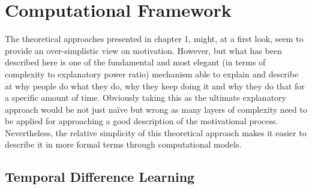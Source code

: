 \section{Computational Framework}
\label{comp_framework}
The theoretical approaches presented in chapter 1, might, at a first look, seem to provide an over-simplistic view on motivation. However, but what has been described here is one of the fundamental and most elegant (in terms of complexity to explanatory power ratio) mechanism able to explain and describe at why people do what they do, why they keep doing it and why they do that for a specific amount of time. Obviously taking this as the ultimate explanatory approach would be not just naïve but wrong as many layers of complexity need to be applied for approaching a good description of the motivational process. Nevertheless, the relative simplicity of this theoretical approach makes it easier to describe it in more formal terms through computational models.


\subsection{Temporal Difference Learning}
\label{td_learning}

